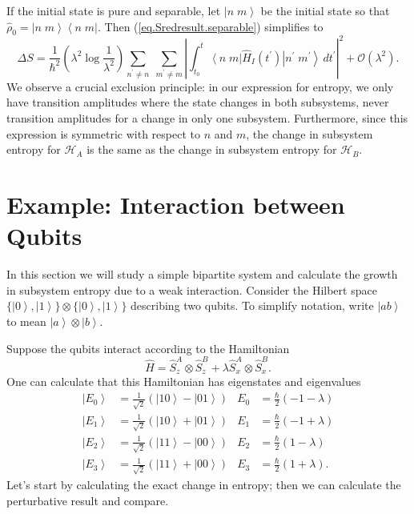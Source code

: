 \documentclass[11pt]{article}
\newcounter{subsubsubsection}[subsubsection]
\newcommand{\Od}[1]{\mathcal{O}{\left(#1\right)}}
\newcommand{\bra}[1]{\left\langle#1\right|}
\newcommand{\ket}[1]{\left|#1\right\rangle}
\newcommand{\hilb}{\mathcal{H}}
\newcommand{\op}[1]{\hat{#1}}
\newcommand{\bket}[2]{\ket{#1\;#2}}
\newcommand{\bbra}[2]{\bra{#1\;#2}}
\theoremstyle{theorem}
\theoremstyle{remark}
\theoremstyle{step}
\theoremstyle{gap}
\begin{document}

If the initial state is pure and separable, let \(\bket{n}{m}\) be the initial state so that \(\op{\rho}_0 = \bket{n}{m}\bbra{n}{m}\). Then (\ref{eq.Sredresult.separable}) simplifies to
\begin{equation}\label{eq.Sredresult.separablepure}
\Delta S =\frac{1}{\hbar^2}\left(\lambda^2 \log\frac{1}{\lambda^2}\right) \sum_{n^\prime\neq n} \;\sum_{m^\prime\neq m} \left|\int_{t_0}^t \bbra{n}{m} \op{H}_I (t^{\prime})\bket{n^\prime}{m^\prime} \,dt^{\prime}\right|^2 + \Od{\lambda^2}.
\end{equation}
We observe a crucial exclusion principle: in our expression for entropy, we only have transition amplitudes where the state changes in both subsystems, never transition amplitudes for a change in only one subsystem. Furthermore, since this expression is symmetric with respect to \(n\) and \(m\), the change in subsystem entropy for \(\hilb_A\) is the same as the change in subsystem entropy for \(\hilb_B\).


\section{Example: Interaction between Qubits}

In this section we will study a simple bipartite system and calculate the growth in subsystem entropy due to a weak interaction. Consider the Hilbert space \(\{\ket{0}, \ket{1}\}\otimes\{\ket{0}, \ket{1}\}\) describing two qubits. To simplify notation, write \(\ket{ab}\) to mean \(\ket{a}\otimes\ket{b}\).

Suppose the qubits interact according to the Hamiltonian
\[
\op{H} = \op{S}_z^{A}\otimes\op{S}_z^B + \lambda \op{S}_x^A \otimes \op{S}_x^B.
\]
One can calculate that this Hamiltonian has eigenstates and eigenvalues
\begin{align*}
\ket{E_0} &= \frac{1}{\sqrt{2}} \left(\ket{10}-\ket{01}\right) &
E_0 &= \frac{\hbar}{2} \left(-1-\lambda\right) \\
\ket{E_1} &= \frac{1}{\sqrt{2}} \left(\ket{10}+\ket{01}\right) &
E_1 &= \frac{\hbar}{2} \left(-1+\lambda\right) \\
\ket{E_2} &= \frac{1}{\sqrt{2}} \left(\ket{11}-\ket{00}\right) &
E_2 &= \frac{\hbar}{2} \left(1-\lambda\right) \\
\ket{E_3} &= \frac{1}{\sqrt{2}} \left(\ket{11}+\ket{00}\right) &
E_3 &= \frac{\hbar}{2} \left(1+\lambda\right).
\end{align*}
Let's start by calculating the exact change in entropy; then we can calculate the perturbative result and compare.
\end{document}
